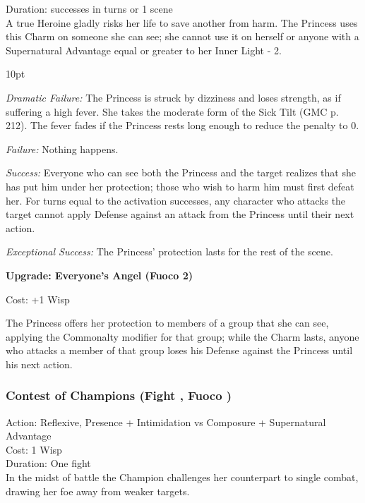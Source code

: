 \noindent Duration: successes in turns or 1 scene\\


A true Heroine gladly risks her life to save another from harm. The Princess uses this Charm on someone she can see; she cannot use it on herself or anyone with a Supernatural Advantage equal or greater to her Inner Light - 2.

\begin{myindentpar}{10pt} 

\emph{Dramatic Failure:} The Princess is struck by dizziness and loses strength, as if suffering a high fever. She takes the moderate form of the Sick Tilt (GMC p. 212). The fever fades if the Princess rests long enough to reduce the penalty to 0.

\emph{Failure:} Nothing happens. 

\emph{Success:} Everyone who can see both the Princess and the target realizes that she has put him under her protection; those who wish to harm him must first defeat her. For turns equal to the activation successes, any character who attacks the target cannot apply Defense against an attack from the Princess until their next action.

\emph{Exceptional Success:} The Princess' protection lasts for the rest of the scene.

\textbf{Upgrade: Everyone's Angel (Fuoco 2)} 

Cost: +1 Wisp

The Princess offers her protection to members of a group that she can see, applying the Commonalty modifier for that group; while the Charm lasts, anyone who attacks a member of that group loses his Defense against the Princess until his next action.\end{myindentpar}


\subsubsection*{Contest of Champions (Fight \textbullet\textbullet, Fuoco \textbullet\textbullet)}

Action: Reflexive, Presence + Intimidation vs Composure + Supernatural Advantage\\

\noindent Cost: 1 Wisp\\

\noindent Duration: One fight\\

\noindent In the midst of battle the Champion challenges her counterpart to single combat, drawing her foe away from weaker targets.

